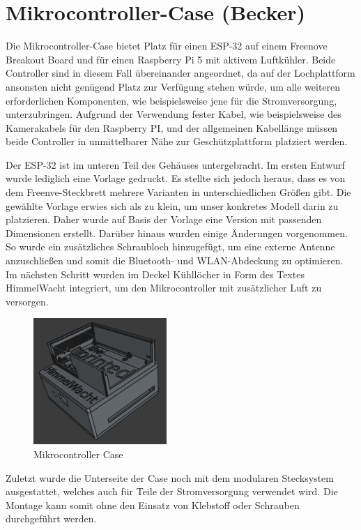 \section{Mikrocontroller-Case (Becker)}

Die Mikrocontroller-Case bietet Platz für einen ESP-32 auf einem Freenove Breakout Board und für einen Raspberry Pi 5 mit aktivem Luftkühler. 
Beide Controller sind in diesem Fall übereinander angeordnet, da auf der Lochplattform ansonsten nicht genügend Platz zur Verfügung stehen würde, um alle weiteren erforderlichen Komponenten, wie beispielsweise jene für die Stromversorgung, unterzubringen. 
Aufgrund der Verwendung fester Kabel, wie beispielsweise des Kamerakabels für den Raspberry PI, und der allgemeinen Kabellänge müssen beide Controller in unmittelbarer Nähe zur Geschützplattform platziert werden.

Der ESP-32 ist im unteren Teil des Gehäuses untergebracht. Im ersten Entwurf wurde lediglich eine Vorlage \cite{cad_esp_case_blueprint} gedruckt. 
Es stellte sich jedoch heraus, dass es von dem Freenve-Steckbrett mehrere Varianten in unterschiedlichen Größen gibt. 
Die gewählte Vorlage erwies sich als zu klein, um unser konkretes Modell darin zu platzieren. 
Daher wurde auf Basis der Vorlage eine Version mit passenden Dimensionen erstellt. 
Darüber hinaus wurden einige Änderungen vorgenommen. So wurde ein zusätzliches Schraubloch hinzugefügt, um eine externe Antenne anzuschließen und somit die Bluetooth- und WLAN-Abdeckung zu optimieren. 
Im nächsten Schritt wurden im Deckel Kühllöcher in Form des Textes HimmelWacht integriert, um den Mikrocontroller mit zusätzlicher Luft zu versorgen.

\begin{figure}[ht]
    \centering
    \includegraphics[width=0.45\textwidth, keepaspectratio]{images/becker_cad_esp_case.png}
    \caption{Mikrocontroller Case}
\end{figure}

Zuletzt wurde die Unterseite der Case noch mit dem modularen Stecksystem ausgestattet, welches auch für Teile der Stromversorgung verwendet wird.
Die Montage kann somit ohne den Einsatz von Klebstoff oder Schrauben durchgeführt werden.

